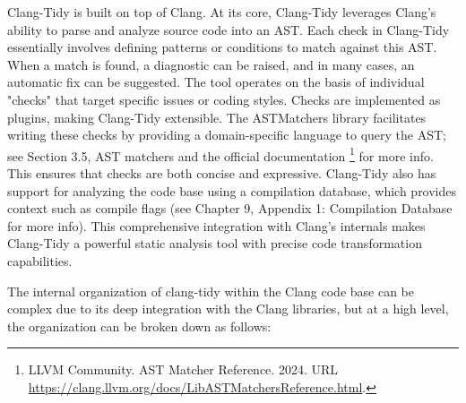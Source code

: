 

Clang-Tidy is built on top of Clang. At its core, Clang-Tidy leverages Clang's ability to parse and analyze source code into an AST. Each check in Clang-Tidy essentially involves defining patterns or conditions to match against this AST. When a match is found, a diagnostic can be raised, and in many cases, an automatic fix can be suggested. The tool operates on the basis of individual "checks" that target specific issues or coding styles. Checks are implemented as plugins, making Clang-Tidy extensible. The ASTMatchers library facilitates writing these checks by providing a domain-specific language to query the AST; see Section 3.5, AST matchers and the official documentation \footnote{LLVM Community. AST Matcher Reference. 2024. URL \url{https://clang.llvm.org/docs/LibASTMatchersReference.html}.} for more info. This ensures that checks are both concise and expressive. Clang-Tidy also has support for analyzing the code base using a compilation database, which provides context such as compile flags (see Chapter 9, Appendix 1: Compilation Database for more info). This comprehensive integration with Clang's internals makes Clang-Tidy a powerful static analysis tool with precise code transformation capabilities.


The internal organization of clang-tidy within the Clang code base can be complex due to its deep integration with the Clang libraries, but at a high level, the organization can be broken down as follows:

